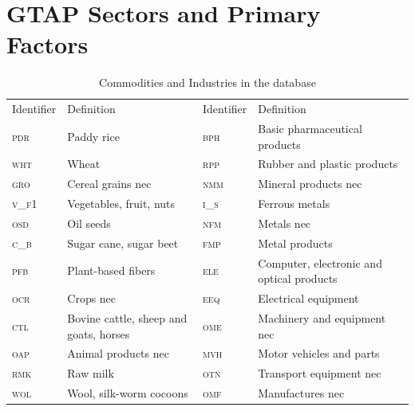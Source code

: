 \section[A]{GTAP Sectors and Primary Factors}\label{sectors}
\renewcommand{\arraystretch}{1}
\renewcommand{\tabcolsep}{1mm}
\begin{table}[ht!]
\renewcommand{\baselinestretch}{1}\normalsize
\begin{center}
\caption{Commodities and Industries in the  database}
\label{allsectors}
\vspace{2ex}
\small
\begin{tabular}{llll}
\toprule
Identifier &Definition & Identifier & Definition  \\
\addlinespace
\midrule
\addlinespace

\textsc{pdr} & 	{Paddy rice}                                   & \textsc{bph} & 	{Basic pharmaceutical products}\\
\textsc{wht} & 	{Wheat}                                        & \textsc{rpp} & 	{Rubber and plastic products}\\
\textsc{gro} & 	{Cereal grains nec}                            & \textsc{nmm} & 	{Mineral products nec}\\
\textsc{v\_f}1 &  {Vegetables, fruit, nuts}                      & \textsc{i\_s} &  {Ferrous metals}\\
\textsc{osd} & 	{Oil seeds}                                    & \textsc{nfm} & 	{Metals nec}\\
\textsc{c\_b} &  {Sugar cane, sugar beet}                       & \textsc{fmp} & 	{Metal products}\\
\textsc{pfb} & 	{Plant-based fibers}                           & \textsc{ele} & 	{Computer, electronic and optical products}\\
\textsc{ocr} & 	{Crops nec}                                    & \textsc{eeq} & 	{Electrical equipment}\\
\textsc{ctl} & 	{Bovine cattle, sheep and goats, horses}       & \textsc{ome} & 	{Machinery and equipment nec}\\
\textsc{oap} & 	{Animal products nec}                          & \textsc{mvh} & 	{Motor vehicles and parts}\\
\textsc{rmk} & 	{Raw milk}                                     & \textsc{otn} & 	{Transport equipment nec}\\
\textsc{wol} & 	{Wool, silk-worm cocoons}                      & \textsc{omf} & 	{Manufactures nec}\\

\end{tabular}
\end{center}
\end{table}
